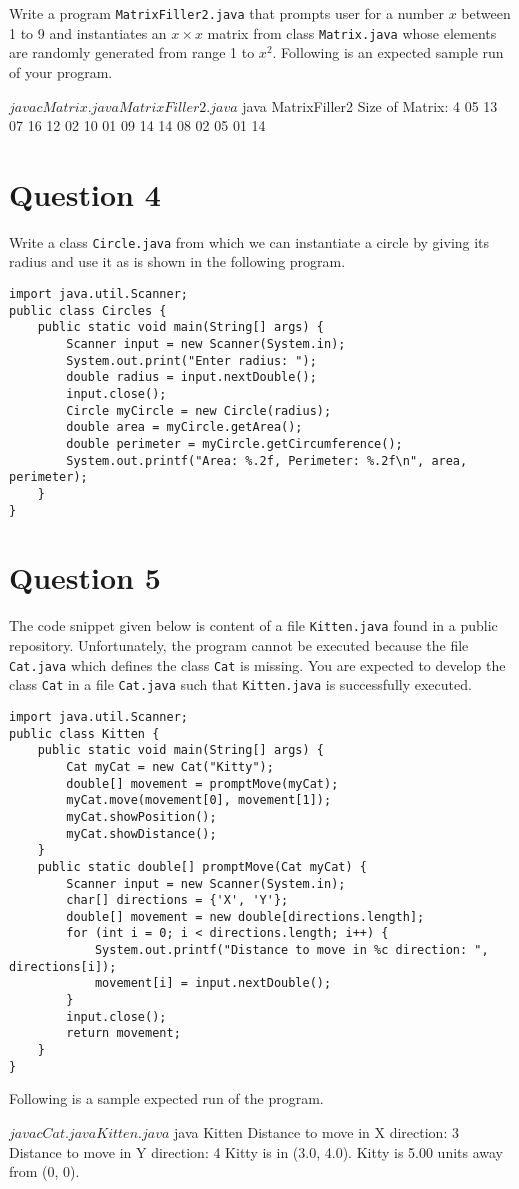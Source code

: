 \documentclass[12pt,letterpaper,twoside]{article}
\begin{document}
Write a program \texttt{MatrixFiller2.java} that prompts user for a number $x$ between 1 to 9 and instantiates an $x \times x$ matrix from class \texttt{Matrix.java} whose elements are randomly generated from range 1 to $x^2$.
Following is an expected sample run of your program.

\begin{terminal}
$ javac Matrix.java MatrixFiller2.java
$ java MatrixFiller2
Size of Matrix: 4
 05 13 07 16
 12 02 10 01
 09 14 14 08
 02 05 01 14
\end{terminal}

\section*{Question 4}

Write a class \texttt{Circle.java} from which we can instantiate a circle by giving its radius and use it as is shown in the following program.

\lstset{caption=}
\lstset{language=Java,tabsize=4}
\begin{lstlisting}
import java.util.Scanner;
public class Circles {
	public static void main(String[] args) {
		Scanner input = new Scanner(System.in);
		System.out.print("Enter radius: ");
		double radius = input.nextDouble();
		input.close();
		Circle myCircle = new Circle(radius);
		double area = myCircle.getArea();
		double perimeter = myCircle.getCircumference();
		System.out.printf("Area: %.2f, Perimeter: %.2f\n", area, perimeter);
	}
}
\end{lstlisting}

\section*{Question 5}

The code snippet given below is content of a file \texttt{Kitten.java} found in a public repository.
Unfortunately, the program cannot be executed because the file \texttt{Cat.java} which defines the class \texttt{Cat} is missing.
You are expected to develop the class \texttt{Cat} in a file \texttt{Cat.java} such that \texttt{Kitten.java} is successfully executed.

\lstset{caption=}
\lstset{language=Java,tabsize=4}
\begin{lstlisting}
import java.util.Scanner;
public class Kitten {
	public static void main(String[] args) {
		Cat myCat = new Cat("Kitty");
		double[] movement = promptMove(myCat);
		myCat.move(movement[0], movement[1]);
		myCat.showPosition();
		myCat.showDistance();
	}
	public static double[] promptMove(Cat myCat) {
		Scanner input = new Scanner(System.in);
		char[] directions = {'X', 'Y'};
		double[] movement = new double[directions.length];
		for (int i = 0; i < directions.length; i++) {
			System.out.printf("Distance to move in %c direction: ", directions[i]);
			movement[i] = input.nextDouble();
		}
		input.close();
		return movement;
	}
}
\end{lstlisting}

Following is a sample expected run of the program.

\begin{terminal}
$ javac Cat.java Kitten.java
$ java Kitten
Distance to move in X direction: 3
Distance to move in Y direction: 4
Kitty is in (3.0, 4.0).
Kitty is 5.00 units away from (0, 0).
\end{terminal}

\end{document}
